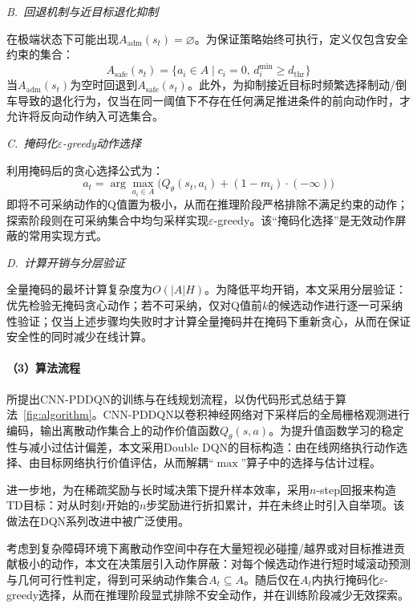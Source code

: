 \documentclass{iopjournal}
\begin{document}
\textit{B.~回退机制与近目标退化抑制}

在极端状态下可能出现$A_{\text{adm}}(s_t) = \varnothing$。为保证策略始终可执行，定义仅包含安全约束的集合：
\begin{equation}
  A_{\text{safe}}(s_t) = \{a_i \in A \mid c_i=0,\, d_i^{\min}\geq d_{\text{thr}}\}
\end{equation}
当$A_{\text{adm}}(s_t)$为空时回退到$A_{\text{safe}}(s_t)$。此外，为抑制接近目标时频繁选择制动/倒车导致的退化行为，仅当在同一阈值下不存在任何满足推进条件的前向动作时，才允许将反向动作纳入可选集合。

\textit{C.~掩码化$\varepsilon$-greedy动作选择}

利用掩码后的贪心选择公式为：
\begin{equation}
  a_t = \arg\max_{a_i \in A}\bigl(Q_\theta(s_t, a_i) + (1 - m_i) \cdot (-\infty)\bigr)
\end{equation}
即将不可采纳动作的Q值置为极小，从而在推理阶段严格排除不满足约束的动作；探索阶段则在可采纳集合中均匀采样实现$\varepsilon$-greedy。该``掩码化选择''是无效动作屏蔽的常用实现方式。

\textit{D.~计算开销与分层验证}

全量掩码的最坏计算复杂度为$O(|A|H)$。为降低平均开销，本文采用分层验证：优先检验无掩码贪心动作；若不可采纳，仅对Q值前$k$的候选动作进行逐一可采纳性验证；仅当上述步骤均失败时才计算全量掩码并在掩码下重新贪心，从而在保证安全性的同时减少在线计算。

\paragraph{（3）算法流程}

所提出CNN-PDDQN的训练与在线规划流程，以伪代码形式总结于算法~\ref{fig:algorithm}。CNN-PDDQN以卷积神经网络对下采样后的全局栅格观测进行编码，输出离散动作集合上的动作价值函数$Q_\theta(s,a)$。为提升值函数学习的稳定性与减小过估计偏差，本文采用Double DQN的目标构造：由在线网络执行动作选择、由目标网络执行价值评估，从而解耦``$\max$''算子中的选择与估计过程。

进一步地，为在稀疏奖励与长时域决策下提升样本效率，采用$n$-step回报来构造TD目标：对从时刻$t$开始的$n$步奖励进行折扣累计，并在未终止时引入自举项。该做法在DQN系列改进中被广泛使用。

考虑到复杂障碍环境下离散动作空间中存在大量短视必碰撞/越界或对目标推进贡献极小的动作，本文在决策层引入动作屏蔽：对每个候选动作进行短时域滚动预测与几何可行性判定，得到可采纳动作集合$A_t \subseteq A$。随后仅在$A_t$内执行掩码化$\varepsilon$-greedy选择，从而在推理阶段显式排除不安全动作，并在训练阶段减少无效探索。
\end{document}
